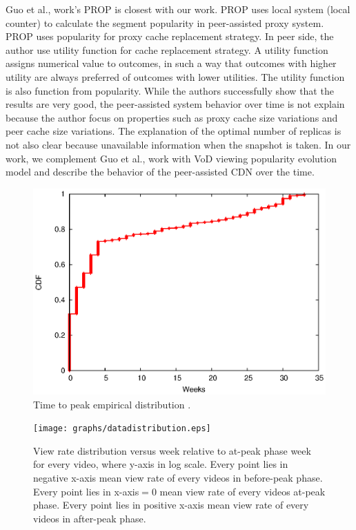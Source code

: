\documentclass[10pt,final,journal,a4paper]{IEEEtran}
\begin{document}
Guo et al., \cite{1613869} work's PROP is closest with our work.
PROP uses local system (local counter) to calculate the segment popularity in peer-assisted proxy system. 
PROP uses popularity for proxy cache replacement strategy. 
In peer side, the author use utility function for cache replacement strategy.
A utility function assigns numerical value to outcomes, in such a way that outcomes with higher utility are always preferred of outcomes with lower utilities.
The utility function is also function from popularity.
While the authors successfully show that the results are very good, the peer-assisted system behavior over time is not explain because the author focus on properties such as proxy cache size variations and peer cache size variations.
The explanation of the optimal number of replicas is not also clear because unavailable information when the snapshot is taken.  
In our work, we complement Guo et al., \cite{1613869} work with VoD viewing popularity evolution model and describe the behavior of the peer-assisted CDN over the time.

\begin{figure}[!t]
\begin{center}
\includegraphics[scale=0.6]{graphs/timetopeak.eps}
\end{center}
\caption{Time to peak empirical distribution \cite{Borghol:2011:CMP:2039452.2039717}.}
\label{fig:timetopeak}
\end{figure} 
\begin{figure}[!t]
\begin{center}
\texttt{[image: graphs/datadistribution.eps]}
\end{center}
\caption{View rate distribution versus week relative to at-peak phase week for every video, where y-axis in log scale.
Every point lies in negative x-axis mean view rate of every videos in before-peak phase.
Every point lies in x-axis$=0$ mean view rate of every videos at-peak phase. 
Every point lies in positive x-axis mean view rate of every videos in after-peak phase. }
\label{fig:viewratedistribution}
\end{figure} 
\end{document}
